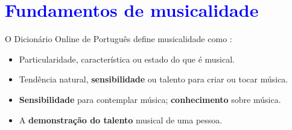 
\chapter{\textcolor{blue}{Fundamentos de musicalidade}}

\begin{definition}[Musicalidade:] 
\label{def:Musicalidade}
O Dicionário Online de Português define musicalidade como \cite{diciomusicalidade}:
\begin{itemize}
\item Particularidade, característica ou estado do que é musical.
\item Tendência natural, \textbf{sensibilidade} ou talento para criar ou tocar música.
\item \textbf{Sensibilidade} para contemplar música; \textbf{conhecimento} sobre música.
\item A \textbf{demonstração do talento} musical de uma pessoa.
\end{itemize}
\end{definition}
















